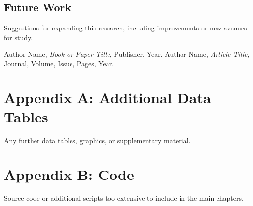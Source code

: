 \documentclass[a4paper,12pt]{report}
\begin{document}
\section{Future Work}
Suggestions for expanding this research, including improvements or new avenues for study.

\begin{thebibliography}{99}

 Author Name, \textit{Book or Paper Title}, Publisher, Year.
 Author Name, \textit{Article Title}, Journal, Volume, Issue, Pages, Year.

\end{thebibliography}
\clearpage

\appendix

\chapter{Appendix A: Additional Data Tables}
Any further data tables, graphics, or supplementary material.

\chapter{Appendix B: Code}
Source code or additional scripts too extensive to include in the main chapters.
\end{document}
